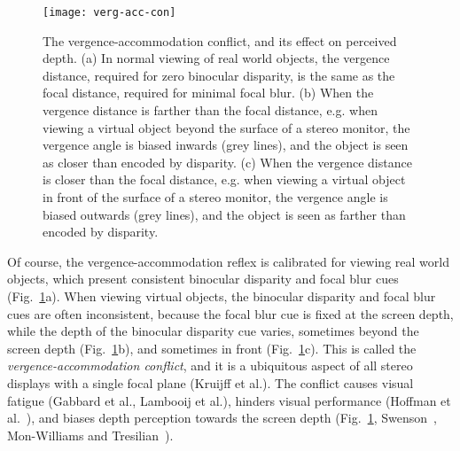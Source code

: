 \documentclass[10pt,journal,compsoc]{IEEEtran}
\makeatletter
\newlength{\FigWidth}
\newcommand{\etal}{et al.\@\xspace} %
\makeatother
\begin{document}
\begin{figure}[!t]
\centering
\texttt{[image: verg-acc-con]}
\caption{The vergence-accommodation conflict, and its effect on perceived depth.  (a) In normal viewing of real world objects, the vergence distance, required for zero binocular disparity, is the same as the focal distance, required for minimal focal blur.  (b) When the vergence distance is farther than the focal distance, e.g. when viewing a virtual object beyond the surface of a stereo monitor, the vergence angle is biased inwards (grey lines), and the object is seen as closer than encoded by disparity.  (c) When the vergence distance is closer than the focal distance, e.g. when viewing a virtual object in front of the surface of a stereo monitor, the vergence angle is biased outwards (grey lines), and the object is seen as farther than encoded by disparity.} 
\label{f:verg-acc-con}
\end{figure}

Of course, the vergence-accommodation reflex is calibrated for viewing real world objects, which present consistent binocular disparity and focal blur cues (Fig.~\ref{f:verg-acc-con}a).  When viewing virtual objects, the binocular disparity and focal blur cues are often inconsistent, because the focal blur cue is fixed at the screen depth, while the depth of the binocular disparity cue varies, sometimes beyond the screen depth (Fig.~\ref{f:verg-acc-con}b), and sometimes in front (Fig.~\ref{f:verg-acc-con}c).  This is called the \emph{vergence-accommodation conflict}, and it is a ubiquitous aspect of all stereo displays with a single focal plane 
(Kruijff \etal \cite{kruijff:2010}).  The conflict causes visual fatigue (Gabbard \etal \cite{gabbard:2017}, Lambooij \etal \cite{lambooij:2009}), hinders visual performance (Hoffman \etal~\cite{hoffman:2008}), and biases depth perception towards the screen depth (Fig.~\ref{f:verg-acc-con}, Swenson~\cite{swenson:1932}, Mon-Williams and Tresilian~\cite{monwilliams:2000}).  
\end{document}
